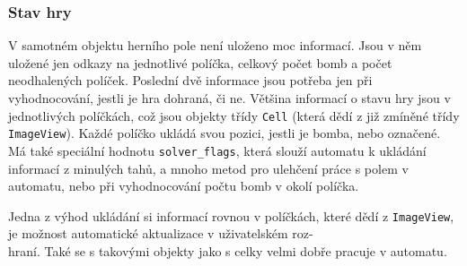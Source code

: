 \subsubsection{Stav hry}
V samotném objektu herního pole není uloženo moc informací. Jsou v něm uložené jen odkazy na jednotlivé políčka,
celkový počet bomb a počet neodhalených políček. Poslední dvě informace jsou potřeba jen při vyhodnocování,
jestli je hra dohraná, či ne. Většina informací o stavu hry jsou v jednotlivých políčkách, což jsou objekty třídy
{\tt Cell} (která dědí z již zmíněné třídy {\tt ImageView}). Každé políčko ukládá svou pozici, jestli je bomba, nebo
označené. Má také speciální hodnotu {\tt solver\_flags}, která slouží automatu k ukládání informací z minulých tahů,
a mnoho metod pro ulehčení práce s polem v automatu, nebo při vyhodnocování počtu bomb v okolí políčka. 

Jedna z výhod ukládání si informací rovnou v políčkách, které dědí z {\tt ImageView}, je možnost automatické aktualizace v uživatelském roz-\\hraní. Také se s takovými objekty jako s celky velmi dobře pracuje v automatu.
